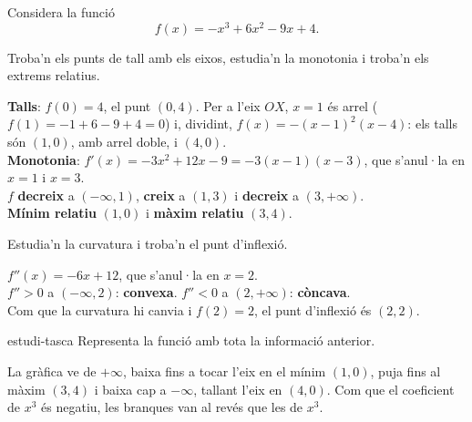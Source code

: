 Considera la funció
\[
f(x)=-x^3+6x^2-9x+4 .
\]

\begin{apartats}

Troba'n els punts de tall amb els eixos, estudia'n la monotonia i troba'n els extrems
relatius.

\begin{solucio}
\textbf{Talls}: $f(0)=4$, el punt $(0,4)$. Per a l'eix $OX$, $x=1$ és arrel ($f(1)=-1+6-9+4=0$) i,
dividint, $f(x)=-(x-1)^2(x-4)$: els talls són $(1,0)$, amb arrel doble, i $(4,0)$.\\
\textbf{Monotonia}: $f'(x)=-3x^2+12x-9=-3(x-1)(x-3)$, que s'anul·la en $x=1$ i $x=3$.\\
$f$ \textbf{decreix} a $(-\infty,1)$, \textbf{creix} a $(1,3)$ i \textbf{decreix} a $(3,+\infty)$.\\
\textbf{Mínim relatiu} $(1,0)$ i \textbf{màxim relatiu} $(3,4)$.
\end{solucio}

\begin{nomesllarg}
Estudia'n la curvatura i troba'n el punt d'inflexió.

\begin{solucio}
$f''(x)=-6x+12$, que s'anul·la en $x=2$.\\
$f''>0$ a $(-\infty,2)$: \textbf{convexa}. \quad $f''<0$ a $(2,+\infty)$: \textbf{còncava}.\\
Com que la curvatura hi canvia i $f(2)=2$, el punt d'inflexió és $(2,2)$.
\end{solucio}
\end{nomesllarg}

\begin{tria}{estudi-tasca}
Representa la funció amb tota la informació anterior.

\begin{solucio}
La gràfica ve de $+\infty$, baixa fins a tocar l'eix en el mínim $(1,0)$, puja fins al màxim $(3,4)$ i
baixa cap a $-\infty$, tallant l'eix en $(4,0)$. Com que el coeficient de $x^3$ és negatiu, les
branques van al revés que les de $x^3$.
\begin{center}
\end{center}
\end{solucio}


\end{tria}
\end{apartats}
